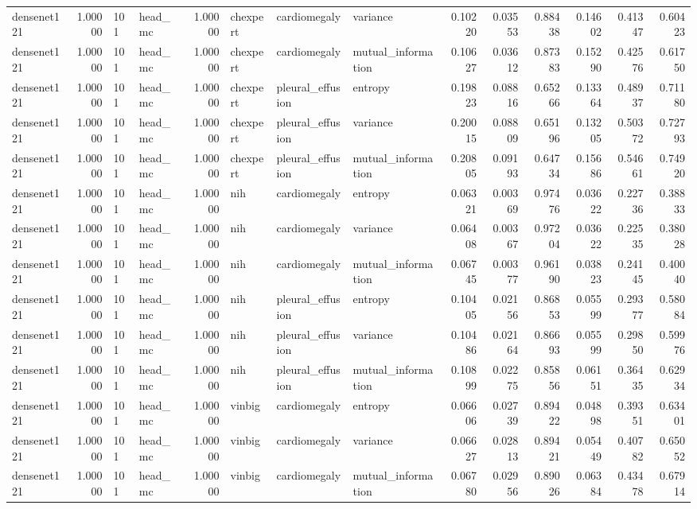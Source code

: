 \begin{tabular}{lrllrlllrrrrrr}
densenet121 & 1.00000 & 101 & head\_mc & 1.00000 & chexpert & cardiomegaly & variance & 0.10220 & 0.03553 & 0.88438 & 0.14602 & 0.41347 & 0.60423 \\
densenet121 & 1.00000 & 101 & head\_mc & 1.00000 & chexpert & cardiomegaly & mutual\_information & 0.10627 & 0.03612 & 0.87383 & 0.15290 & 0.42576 & 0.61750 \\
densenet121 & 1.00000 & 101 & head\_mc & 1.00000 & chexpert & pleural\_effusion & entropy & 0.19823 & 0.08816 & 0.65266 & 0.13364 & 0.48937 & 0.71180 \\
densenet121 & 1.00000 & 101 & head\_mc & 1.00000 & chexpert & pleural\_effusion & variance & 0.20015 & 0.08809 & 0.65196 & 0.13205 & 0.50372 & 0.72793 \\
densenet121 & 1.00000 & 101 & head\_mc & 1.00000 & chexpert & pleural\_effusion & mutual\_information & 0.20805 & 0.09193 & 0.64734 & 0.15686 & 0.54661 & 0.74920 \\
densenet121 & 1.00000 & 101 & head\_mc & 1.00000 & nih & cardiomegaly & entropy & 0.06321 & 0.00369 & 0.97476 & 0.03622 & 0.22736 & 0.38833 \\
densenet121 & 1.00000 & 101 & head\_mc & 1.00000 & nih & cardiomegaly & variance & 0.06408 & 0.00367 & 0.97204 & 0.03622 & 0.22535 & 0.38028 \\
densenet121 & 1.00000 & 101 & head\_mc & 1.00000 & nih & cardiomegaly & mutual\_information & 0.06745 & 0.00377 & 0.96190 & 0.03823 & 0.24145 & 0.40040 \\
densenet121 & 1.00000 & 101 & head\_mc & 1.00000 & nih & pleural\_effusion & entropy & 0.10405 & 0.02156 & 0.86853 & 0.05599 & 0.29377 & 0.58084 \\
densenet121 & 1.00000 & 101 & head\_mc & 1.00000 & nih & pleural\_effusion & variance & 0.10486 & 0.02164 & 0.86693 & 0.05599 & 0.29850 & 0.59976 \\
densenet121 & 1.00000 & 101 & head\_mc & 1.00000 & nih & pleural\_effusion & mutual\_information & 0.10899 & 0.02275 & 0.85856 & 0.06151 & 0.36435 & 0.62934 \\
densenet121 & 1.00000 & 101 & head\_mc & 1.00000 & vinbig & cardiomegaly & entropy & 0.06606 & 0.02739 & 0.89422 & 0.04898 & 0.39351 & 0.63401 \\
densenet121 & 1.00000 & 101 & head\_mc & 1.00000 & vinbig & cardiomegaly & variance & 0.06627 & 0.02813 & 0.89421 & 0.05449 & 0.40782 & 0.65052 \\
densenet121 & 1.00000 & 101 & head\_mc & 1.00000 & vinbig & cardiomegaly & mutual\_information & 0.06780 & 0.02956 & 0.89026 & 0.06384 & 0.43478 & 0.67914 \\

\end{tabular}

